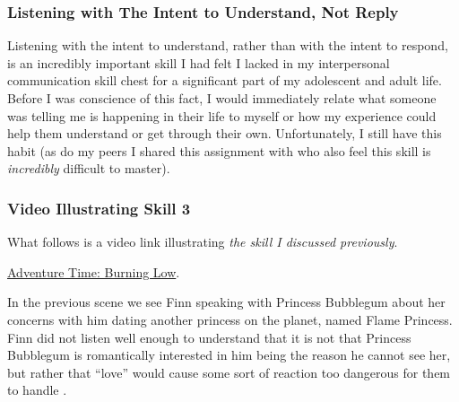 \documentclass[stu,12pt]{apa7}
\begin{document}
      \subsubsection{Listening with The Intent to Understand, Not Reply}
        Listening with the intent to understand, rather than with the intent to
          respond, is an incredibly important skill I had felt I lacked in
          my interpersonal communication skill chest for a significant part of
          my adolescent and adult life. Before I was conscience of this fact, I
          would immediately relate what someone was telling me is happening in
          their life to myself or how my experience could help them understand
          or get through their own. Unfortunately, I still have this habit
          (as do my peers I shared this assignment with who also feel this
          skill is \textit{incredibly} difficult to master).

        \subsubsection*{Video Illustrating Skill 3}
          What follows is a video link illustrating \textit{the skill I
            discussed previously}.

          \href{https://youtu.be/sk_M0-3qaVQ?t=102}%
            {Adventure Time: Burning Low}.

          In the previous scene we see Finn speaking with Princess Bubblegum
            about her concerns with him dating another princess on the planet,
            named Flame Princess. Finn did not listen well enough to understand
            that it is not that Princess Bubblegum is romantically interested in
            him being the reason he cannot see her, but rather that ``love''
            would cause some sort of reaction too dangerous for them to handle
            \parencite[00:01:02--00:01:57]{leichliter_adventure_2018}.




  \newpage
  \printbibliography[%
    title={References},%
    heading={bibintoc},%
    notcategory={consulted}%
  ]

  \newpage
  \nocite{*}
  \printbibliography[%
    title={Additional References},%
    heading={bibintoc},%
    category={consulted}%
  ]
\end{document}
